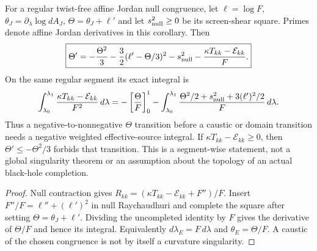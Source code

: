 \documentclass[12pt,a4paper]{article}
\begin{document}
\begin{corollary}
\label{p8:cor:v2212-null-focusing-budget}
For a regular twist-free affine Jordan null congruence, let
$\ell=\log F$, $\theta_J=\partial_\lambda\log dA_J$,
$\Theta=\theta_J+\ell'$ and let $s_{\rm null}^2\ge0$ be its screen-shear
square. Primes denote affine Jordan derivatives in this corollary. Then
\begin{equation}
\label{p8:eq:v2212-null-completed-square}
 \boxed{\Theta'=-\frac{\Theta^2}{3}
 -\frac32(\ell'-\Theta/3)^2-s_{\rm null}^2
 -\frac{\kappa T_{kk}-\mathcal E_{kk}}F.}
\end{equation}
On the same regular segment its exact integral is
\begin{equation}
\label{p8:eq:v2212-null-source-integral}
 \int_{\lambda_0}^{\lambda_1}
 \frac{\kappa T_{kk}-\mathcal E_{kk}}{F^2}\,d\lambda
 =-\left[\frac\Theta F\right]_0^1
 -\int_{\lambda_0}^{\lambda_1}
 \frac{\Theta^2/2+s_{\rm null}^2+3(\ell')^2/2}{F}\,d\lambda.
\end{equation}
Thus a negative-to-nonnegative $\Theta$ transition before a caustic or
domain transition needs a negative weighted effective-source integral.
If $\kappa T_{kk}-\mathcal E_{kk}\ge0$, then
$\Theta'\le-\Theta^2/3$ forbids that transition. This is a segment-wise
statement, not a global singularity theorem or an assumption about the
topology of an actual black-hole completion.
\end{corollary}
\begin{proof}
Null contraction gives
$R_{kk}=(\kappa T_{kk}-\mathcal E_{kk}+F'')/F$.
Insert $F''/F=\ell''+(\ell')^2$ in null Raychaudhuri and complete the
square after setting $\Theta=\theta_J+\ell'$. Dividing the uncompleted
identity by $F$ gives the derivative of $\Theta/F$ and hence its integral.
Equivalently $d\lambda_E=F\,d\lambda$ and $\theta_E=\Theta/F$.
A caustic of the chosen congruence is not by itself a curvature singularity.
\end{proof}
\end{document}
